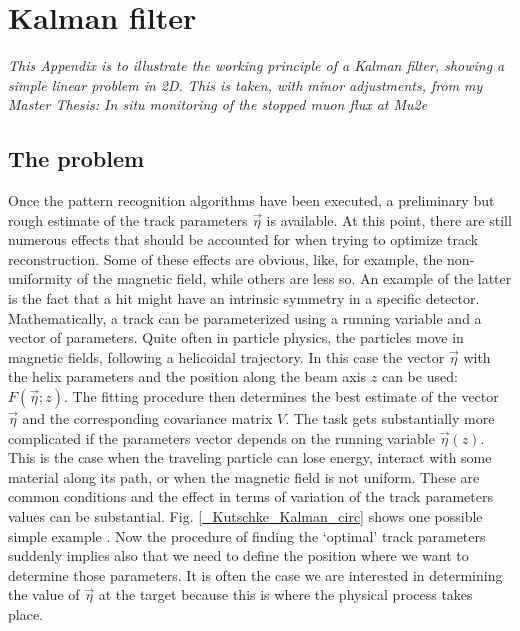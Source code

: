 \chapter{Kalman filter}
{\itshape
This Appendix is to illustrate the working principle of a Kalman filter, showing a simple linear problem in 2D.
This is taken, with minor adjustments, from my Master Thesis: In situ monitoring of the stopped muon flux at Mu2e}
\label{ch:Kalman}

\section{The problem}
    Once the pattern recognition algorithms have been executed, a preliminary but rough estimate of the track parameters $\vec{\eta}$ is available. 
    At this point, there are still numerous effects that should be accounted for when trying to optimize track reconstruction. 
    Some of these effects are obvious, like, for example, the non-uniformity of the magnetic field, while others are less so. 
    An example of the latter is the fact that a hit might have an intrinsic symmetry in a specific detector. \\

    \noindent
    Mathematically, a track can be parameterized using a running variable and a vector of parameters. 
    Quite often in particle physics, the particles move in magnetic fields, following a helicoidal trajectory. 
    In this case the vector $\vec{\eta}$ with the helix parameters and the position along the beam axis $z$ can be used: $F(\vec{\eta};z)$. 
    The fitting procedure then determines the best estimate of the vector $\vec{\eta}$ and the corresponding covariance matrix $V$. 
    The task gets substantially more complicated if the parameters vector depends on the running variable $\vec{\eta}(z)$. 
    This is the case when the traveling particle can lose energy, interact with some material along its path, or when the magnetic field is not uniform. 
    These are common conditions and the effect in terms of variation of the track parameters values can be substantial.
    Fig. \ref{_Kutschke_Kalman_circ} shows one possible simple example \cite{Kutschke}.
    Now the procedure of finding the `optimal' track parameters suddenly implies also that we need to define the position where we want to determine those parameters.
    It is often the case we are interested in determining the value of $\vec{\eta}$ at the target because this is where the physical process takes place. 

